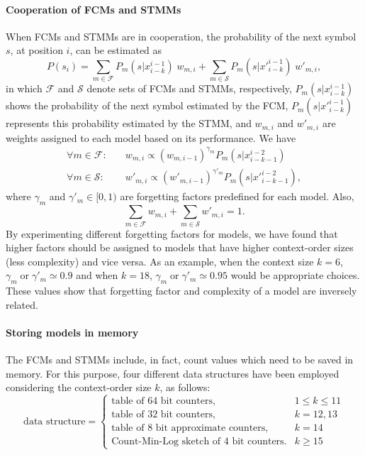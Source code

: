 \paragraph{Cooperation of FCMs and STMMs}
When FCMs and STMMs are in cooperation, the probability of the next symbol $s$, at position $i$, can be estimated as
\begin{equation}
P(s_i) = \sum_{m\in\mathcal{F}} P_m(s|x_{i-k}^{i-1})\;w_{m,i} + \sum_{m\in\mathcal{S}} P_m(s|{x'}_{i-k}^{i-1})\;w'_{m,i},
\end{equation}
in which $\mathcal{F}$ and $\mathcal{S}$ denote sets of FCMs and STMMs, respectively, $P_m(s|x_{i-k}^{i-1})$ shows the probability of the next symbol estimated by the FCM, $P_m(s|{x'}_{i-k}^{i-1})$ represents this probability estimated by the STMM, and $w_{m,i}$ and $w'_{m,i}$ are weights assigned to each model based on its performance. We have
\begin{align}
\forall m\in\mathcal{F}:\quad &w_{m,i} \propto (w_{m,i-1})^{\gamma_m} P_m(s | x_{i-k-1}^{i-2})
\nonumber
\\[1mm]
\forall m\in\mathcal{S}:\quad &w'_{m,i} \propto (w'_{m,i-1})^{\gamma'_m} P_m(s | {x'}_{i-k-1}^{i-2}),
\end{align}
where $\gamma_m$ and $\gamma'_m \in [0,1)$ are forgetting factors predefined for each model. Also,
\begin{equation}
\sum_{m\in\mathcal{F}} w_{m,i} + \sum_{m\in\mathcal{S}} w'_{m,i} = 1.
\end{equation}
By experimenting different forgetting factors for models, we have found that higher factors should be assigned to models that have higher context-order sizes (less complexity) and vice versa. As an example, when the context size $k=6$, $\gamma_m \mathrm{\;or\;} \gamma'_m \simeq 0.9$ and when $k=18$, $\gamma_m \mathrm{\;or\;} \gamma'_m \simeq 0.95$ would be appropriate choices. These values show that forgetting factor and complexity of a model are inversely related.

\paragraph{Storing models in memory}
The FCMs and STMMs include, in fact, count values which need to be saved in memory. For this purpose, four different data structures have been employed considering the context-order size $k$, as follows:
\begin{equation*}
  \textrm{data structure} =
\begin{cases}
  \textrm{table of 64 bit counters}, & 1 \leq k \leq 11 \\
  \textrm{table of 32 bit counters}, & k=12, 13 \\
  \textrm{table of 8 bit approximate counters}, & k=14 \\
  \textrm{Count-Min-Log sketch of 4 bit counters}. & k \ge 15
\end{cases}
\end{equation*}

